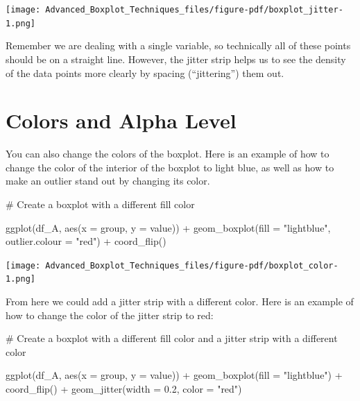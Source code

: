 \documentclass[
  letterpaper,
  DIV=11,
  numbers=noendperiod]{scrreprt}
\newenvironment{Shaded}{\begin{snugshade}}{\end{snugshade}}
\newcommand{\AttributeTok}[1]{\textcolor[rgb]{0.40,0.45,0.13}{#1}}
\newcommand{\CommentTok}[1]{\textcolor[rgb]{0.37,0.37,0.37}{#1}}
\newcommand{\FloatTok}[1]{\textcolor[rgb]{0.68,0.00,0.00}{#1}}
\newcommand{\FunctionTok}[1]{\textcolor[rgb]{0.28,0.35,0.67}{#1}}
\newcommand{\NormalTok}[1]{\textcolor[rgb]{0.00,0.23,0.31}{#1}}
\newcommand{\SpecialCharTok}[1]{\textcolor[rgb]{0.37,0.37,0.37}{#1}}
\newcommand{\StringTok}[1]{\textcolor[rgb]{0.13,0.47,0.30}{#1}}
\begin{document}
\begin{center}
\texttt{[image: Advanced\_Boxplot\_Techniques\_files/figure-pdf/boxplot\_jitter-1.png]}
\end{center}

Remember we are dealing with a single variable, so technically all of
these points should be on a straight line. However, the jitter strip
helps us to see the density of the data points more clearly by spacing
(``jittering'') them out.

\section*{Colors and Alpha Level}\label{colors-and-alpha-level}


You can also change the colors of the boxplot. Here is an example of how
to change the color of the interior of the boxplot to light blue, as
well as how to make an outlier stand out by changing its color.

\begin{Shaded}
\begin{Highlighting}[]
\CommentTok{\# Create a boxplot with a different fill color}

\FunctionTok{ggplot}\NormalTok{(df\_A, }\FunctionTok{aes}\NormalTok{(}\AttributeTok{x =}\NormalTok{ group, }\AttributeTok{y =}\NormalTok{ value)) }\SpecialCharTok{+}
  \FunctionTok{geom\_boxplot}\NormalTok{(}\AttributeTok{fill =} \StringTok{"lightblue"}\NormalTok{, }\AttributeTok{outlier.colour =} \StringTok{"red"}\NormalTok{) }\SpecialCharTok{+}
  \FunctionTok{coord\_flip}\NormalTok{()}
\end{Highlighting}
\end{Shaded}

\begin{center}
\texttt{[image: Advanced\_Boxplot\_Techniques\_files/figure-pdf/boxplot\_color-1.png]}
\end{center}

From here we could add a jitter strip with a different color. Here is an
example of how to change the color of the jitter strip to red:

\begin{Shaded}
\begin{Highlighting}[]
\CommentTok{\# Create a boxplot with a different fill color and a jitter strip with a different color}

\FunctionTok{ggplot}\NormalTok{(df\_A, }\FunctionTok{aes}\NormalTok{(}\AttributeTok{x =}\NormalTok{ group, }\AttributeTok{y =}\NormalTok{ value)) }\SpecialCharTok{+}
  \FunctionTok{geom\_boxplot}\NormalTok{(}\AttributeTok{fill =} \StringTok{"lightblue"}\NormalTok{) }\SpecialCharTok{+}
  \FunctionTok{coord\_flip}\NormalTok{() }\SpecialCharTok{+}
  \FunctionTok{geom\_jitter}\NormalTok{(}\AttributeTok{width =} \FloatTok{0.2}\NormalTok{, }\AttributeTok{color =} \StringTok{"red"}\NormalTok{)}
\end{Highlighting}
\end{Shaded}
\end{document}
